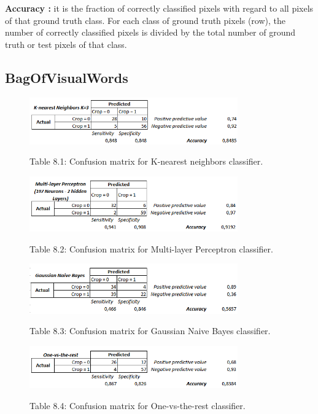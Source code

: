 \documentclass[12pt]{article}
\numberwithin{equation}{section}
\numberwithin{table}{section}
\numberwithin{figure}{section}
\begin{document}
\noindent
\textbf{Accuracy : }it is the fraction of correctly classified pixels with regard to all pixels of that ground truth class. For each class of ground truth pixels (row), the number of correctly classified pixels is divided by the total number of ground truth or test pixels of that class. 


\subsection{BagOfVisualWords}

\begin{figure}[H] \centering
	\caption*{Table 8.1: Confusion matrix for K-nearest neighbors classifier. }
	\includegraphics[width=0.8\textwidth]{m1.png}
	\label{m1}
\end{figure}

\begin{figure}[H] \centering
	\caption*{Table 8.2: Confusion matrix for Multi-layer Perceptron classifier. }
	\includegraphics[width=0.8\textwidth]{m2.png}
	\label{m2}
\end{figure}

\begin{figure}[H] \centering
	\caption*{Table 8.3: Confusion matrix for Gaussian Naive Bayes classifier. }
	\includegraphics[width=0.8\textwidth]{m3.png}
	\label{m3}
\end{figure}

\begin{figure}[H] \centering
	\caption*{Table 8.4: Confusion matrix for One-vs-the-rest classifier. }
	\includegraphics[width=0.8\textwidth]{m4.png}
	\label{m4}
\end{figure}
\end{document}
